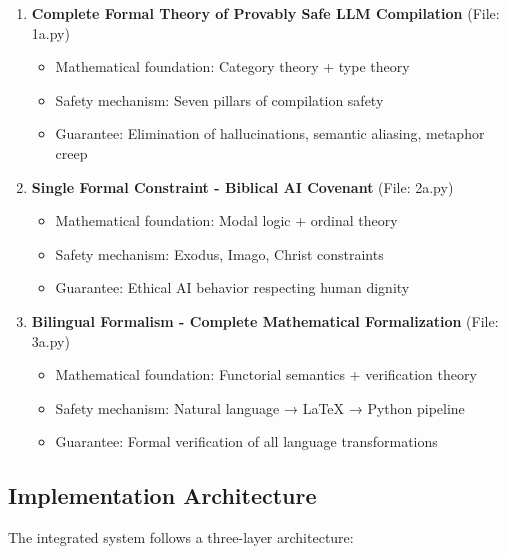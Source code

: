 \documentclass[12pt]{article}
\begin{document}
\begin{enumerate}[label=\textbf{Framework \arabic*:}]
    \item \textbf{Complete Formal Theory of Provably Safe LLM Compilation} (File: 1a.py)
    \begin{itemize}
        \item Mathematical foundation: Category theory + type theory
        \item Safety mechanism: Seven pillars of compilation safety
        \item Guarantee: Elimination of hallucinations, semantic aliasing, metaphor creep
    \end{itemize}

    \item \textbf{Single Formal Constraint - Biblical AI Covenant} (File: 2a.py)
    \begin{itemize}
        \item Mathematical foundation: Modal logic + ordinal theory
        \item Safety mechanism: Exodus, Imago, Christ constraints
        \item Guarantee: Ethical AI behavior respecting human dignity
    \end{itemize}

    \item \textbf{Bilingual Formalism - Complete Mathematical Formalization} (File: 3a.py)
    \begin{itemize}
        \item Mathematical foundation: Functorial semantics + verification theory
        \item Safety mechanism: Natural language → LaTeX → Python pipeline
        \item Guarantee: Formal verification of all language transformations
    \end{itemize}
\end{enumerate}

\subsection{Implementation Architecture}

The integrated system follows a three-layer architecture:
\end{document}
